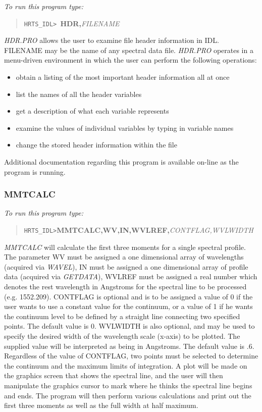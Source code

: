 {\em To run this program type:}
\begin{quote}
{\tt HRTS\_IDL> }{\bf HDR,}{\em FILENAME}
\end{quote}
{\em HDR.PRO} allows the user to examine file header information in IDL.
   FILENAME may be the name of any spectral data file. {\em HDR.PRO} operates
   in a menu-driven environment in which the user can perform the
   following operations:
\begin{itemize}
\item   obtain a listing of the most important header
       information all at once
\item   list the names of all the header variables
\item   get a description of what each variable represents
\item   examine the values of individual variables by typing
       in variable names
\item   change the stored header information within the file

\end{itemize}
   Additional documentation regarding this program is available on-line
   as the program is running.

\subsubsection{MMTCALC}

{\em To run this program type:}
\begin{quote}
{\tt HRTS\_IDL>}{\bf MMTCALC,WV,IN,WVLREF,}{\it CONTFLAG,WVLWIDTH}
\end{quote}
{\em MMTCALC} will calculate the first three moments
for a single spectral profile.  The parameter WV must be assigned a one
dimensional array of wavelengths (acquired via {\em WAVEL}), IN must be assigned
a one dimensional array of profile data (acquired via {\em GETDATA}), WVLREF
must be assigned a real number which denotes the rest wavelength in Angstroms
for the spectral line to be processed (e.g. 1552.209).  CONTFLAG is optional
and is to be assigned a value of 0 if the user wants to use a constant value
for the continuum, or a value of 1 if he wants the continuum level to be
defined by a straight line connecting two specified points. The default value
is 0.  WVLWIDTH is also optional, and may be used to specify the desired width
of the wavelength scale (x-axis) to be plotted.  The supplied value will be
interpreted as being in Angstroms. The default value is .6. Regardless of the
value of CONTFLAG, two points must be selected to determine the continuum and
the maximum limits of integration.  A plot will be made on the graphics screen
that shows the spectral line, and the user will then manipulate the graphics
cursor to mark where he thinks the spectral line begins and ends.  The program
will then perform various calculations and print out the first three moments as
well as the full width at half maximum.

